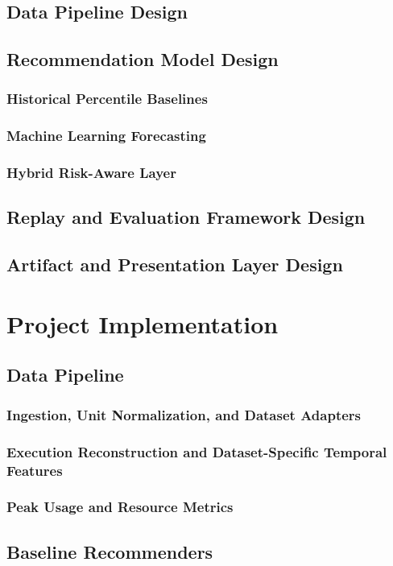 \documentclass{IEEEtran}
\begin{document}
\subsection{Data Pipeline Design}
\subsection{Recommendation Model Design}
\subsubsection{Historical Percentile Baselines}
\subsubsection{Machine Learning Forecasting}
\subsubsection{Hybrid Risk-Aware Layer}
\subsection{Replay and Evaluation Framework Design}
\subsection{Artifact and Presentation Layer Design}
\section{Project Implementation}
\subsection{Data Pipeline}
\subsubsection{Ingestion, Unit Normalization, and Dataset Adapters}
\subsubsection{Execution Reconstruction and Dataset-Specific Temporal Features}
\subsubsection{Peak Usage and Resource Metrics}
\subsection{Baseline Recommenders}
\end{document}
